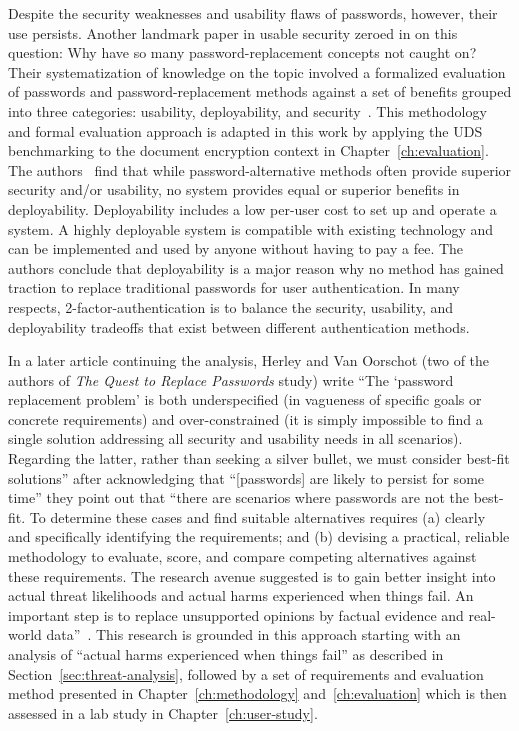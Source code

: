 Despite the security weaknesses and usability flaws of passwords, however, their use persists. Another landmark paper in usable security zeroed in on this question: Why have so many password-replacement concepts not caught on? Their systematization of knowledge on the topic involved a formalized evaluation of passwords and password-replacement methods against a set of benefits grouped into three categories: usability, deployability, and security~\cite{bonneau_quest_2012}. This methodology and formal evaluation approach is adapted in this work by applying the UDS benchmarking to the document encryption context in Chapter~\ref{ch:evaluation}. The authors~\cite{bonneau_quest_2012} find that while password-alternative methods often provide superior security and/or usability, no system provides equal or superior benefits in deployability. Deployability includes a low per-user cost to set up and operate a system. A highly deployable system is compatible with existing technology and can be implemented and used by anyone without having to pay a fee. The authors conclude that deployability is a major reason why no method has gained traction to replace traditional passwords for user authentication. In many respects, 2-factor-authentication is to balance the security, usability, and deployability tradeoffs that exist between different authentication methods.

In a later article continuing the analysis, Herley and Van Oorschot (two of the authors of \emph{The Quest to Replace Passwords} study) write ``The `password replacement problem' is both underspecified (in vagueness of specific goals or concrete requirements) and over-constrained (it is simply impossible to find a single solution addressing all security and usability needs in all scenarios). Regarding the latter, rather than seeking a silver bullet, we must consider best-fit solutions'' after acknowledging that ``[passwords] are likely to persist for some time'' they point out that ``there are scenarios where passwords are not the best-fit. To determine these cases and find suitable alternatives requires (a) clearly and specifically identifying the requirements; and (b) devising a practical, reliable methodology to evaluate, score, and compare competing alternatives against these requirements. The research avenue suggested is to gain better insight into actual threat likelihoods and actual harms experienced when things fail. An important step is to replace unsupported opinions by factual evidence and real-world data''~\cite{herley_research_2011}. This research is grounded in this approach starting with an analysis of ``actual harms experienced when things fail'' as described in Section~\ref{sec:threat-analysis}, followed by a set of requirements and evaluation method presented in Chapter~\ref{ch:methodology} and~\ref{ch:evaluation} which is then assessed in a lab study in Chapter~\ref{ch:user-study}.

